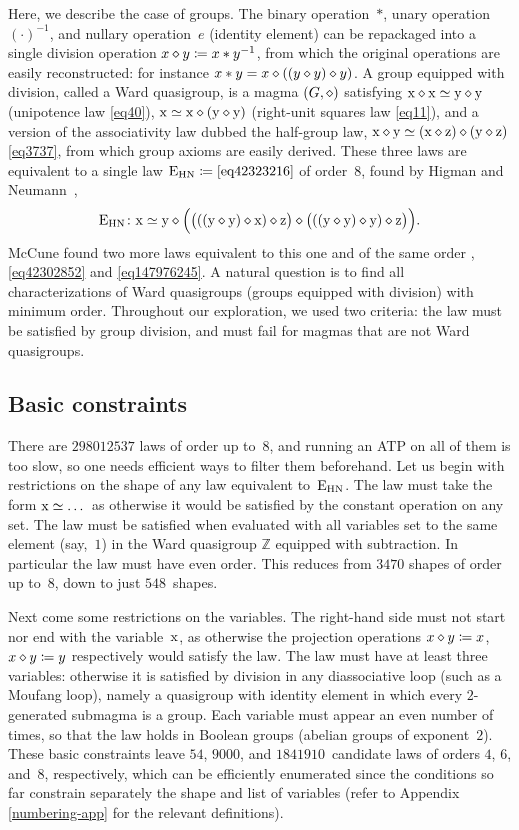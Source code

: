 Here, we describe the case of groups.  The binary operation~$*$, unary operation~$(\cdot )^{-1}$, and nullary operation~$e$ (identity element) can be repackaged into a single division operation $x \diamond y \coloneqq x*y^{-1}$, from which the original operations are easily reconstructed: for instance $x*y=x\diamond((y\diamond y)\diamond y)$.  A group equipped with division, called a Ward quasigroup, is a magma $(G, \diamond)$ satisfying $\mathrm{x} \diamond \mathrm{x} \simeq \mathrm{y} \diamond \mathrm{y}$ (unipotence law \eqref{eq40}), $\mathrm{x} \simeq \mathrm{x} \diamond (\mathrm{y} \diamond \mathrm{y})$ (right-unit squares law \eqref{eq11}), and a version of the associativity law dubbed the half-group law, $\mathrm{x} \diamond \mathrm{y} \simeq (\mathrm{x} \diamond \mathrm{z}) \diamond (\mathrm{y} \diamond \mathrm{z})$ \eqref{eq3737}, from which group axioms are easily derived.
These three laws are equivalent to a single law $\mathrm{E}_{\mathrm{HN}}\coloneqq\eqref{eq42323216}$ of order~$8$, found by Higman and Neumann~\cite{higman-neumann},
\[
\mathrm{E}_{\mathrm{HN}} \colon \mathrm{x} \simeq \mathrm{y} \diamond \Bigl(\bigl(((\mathrm{y} \diamond \mathrm{y}) \diamond \mathrm{x}) \diamond \mathrm{z}\bigr) \diamond \bigl(((\mathrm{y} \diamond \mathrm{y}) \diamond \mathrm{y}) \diamond \mathrm{z}\bigr)\Bigr) .
\]
McCune found two more laws equivalent to this one and of the same order \cite{mccune1993single}, \eqref{eq42302852} and \eqref{eq147976245}.  A natural question is to find all characterizations of Ward quasigroups (groups equipped with division) with minimum order.
Throughout our exploration, we used two criteria: the law must be satisfied by group division, and must fail for magmas that are not Ward quasigroups.

\subsection{Basic constraints}

There are $\num{298012537}$ laws of order up to~$8$, and running an ATP on all of them is too slow, so one needs efficient ways to filter them beforehand.  Let us begin with restrictions on the shape of any law equivalent to~$\mathrm{E}_{\mathrm{HN}}$.
The law must take the form $\mathrm{x}\simeq\dots$ as otherwise it would be satisfied by the constant operation on any set.
The law must be satisfied when evaluated with all variables set to the same element (say,~$1$) in the Ward quasigroup $\mathbb{Z}$ equipped with subtraction.  In particular the law must have even order.
This reduces from $\num{3470}$ shapes of order up to~$8$, down to just $548$~shapes.

Next come some restrictions on the variables.
The right-hand side must not start nor end with the variable~$\mathrm{x}$, as otherwise the projection operations $x\diamond y \coloneqq x$, $x\diamond y\coloneqq y$ respectively would satisfy the law.
The law must have at least three variables: otherwise it is satisfied by division in any diassociative loop (such as a Moufang loop), namely a quasigroup with identity element in which every $2$-generated submagma is a group.
Each variable must appear an even number of times, so that the law holds in Boolean groups (abelian groups of exponent~$2$).
These basic constraints leave $54$, $\num{9000}$, and $\num{1841910}$~candidate laws of orders $4$, $6$, and~$8$, respectively, which can be efficiently enumerated since the conditions so far constrain separately the shape and list of variables (refer to Appendix \ref{numbering-app} for the relevant definitions).


